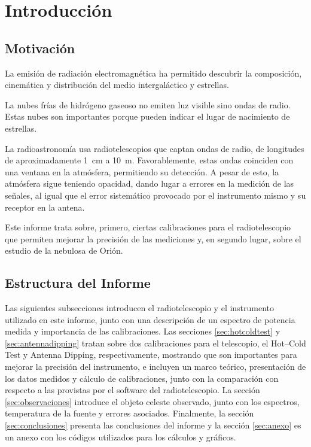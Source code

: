 \section{Introducción}

\subsection{Motivación}

La emisión de radiación electromagnética ha permitido descubrir la composición, cinemática y distribución del medio intergaláctico y estrellas.

La nubes frías de hidrógeno gaseoso no emiten luz visible sino ondas de radio. Estas nubes son importantes porque pueden indicar el lugar de nacimiento de estrellas.

La radioastronomía usa radiotelescopios que captan ondas de radio, de longitudes de aproximadamente \SI{1}{\centi\meter} a \SI{10}{\meter}. Favorablemente, estas ondas coinciden con una ventana en la atmósfera, permitiendo su detección. A pesar de esto, la atmósfera sigue teniendo opacidad, dando lugar a errores en la medición de las señales, al igual que el error sistemático provocado por el instrumento mismo y su receptor en la antena.

Este informe trata sobre, primero, ciertas calibraciones para el radiotelescopio que permiten mejorar la precisión de las mediciones y, en segundo lugar, sobre el estudio de la nebulosa de Orión.

\subsection{Estructura del Informe}

Las siguientes subsecciones introducen el radiotelescopio y el instrumento utilizado en este informe, junto con una descripción de un espectro de potencia medida y importancia de las calibraciones. Las secciones \ref{sec:hotcoldtest} y \ref{sec:antennadipping} tratan sobre dos calibraciones para el telescopio, el Hot--Cold Test y Antenna Dipping, respectivamente, mostrando que son importantes para mejorar la precisión del instrumento, e incluyen un marco teórico, presentación de los datos medidos y cálculo de calibraciones, junto con la comparación con respecto a las provistas por el software del radiotelescopio. La sección \ref{sec:observaciones} introduce el objeto celeste observado, junto con los espectros, temperatura de la fuente y errores asociados. Finalmente, la sección \ref{sec:conclusiones} presenta las conclusiones del informe y la sección \ref{sec:anexo} es un anexo con los códigos utilizados para los cálculos y gráficos.


